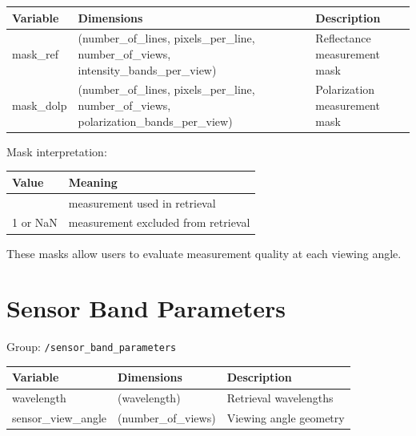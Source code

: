 \documentclass[
  letterpaper,
]{scrbook}
\begin{document}
\begin{longtable}[]{@{}
  >{\raggedright\arraybackslash}p{}
  >{\raggedright\arraybackslash}p{}
  >{\raggedright\arraybackslash}p{}@{}}
\toprule\noalign{}
\begin{minipage}[b]{\linewidth}\raggedright
Variable
\end{minipage} & \begin{minipage}[b]{\linewidth}\raggedright
Dimensions
\end{minipage} & \begin{minipage}[b]{\linewidth}\raggedright
Description
\end{minipage} \\
\midrule\noalign{}
\endhead
\bottomrule\noalign{}
\endlastfoot
mask\_ref & (number\_of\_lines, pixels\_per\_line, number\_of\_views,
intensity\_bands\_per\_view) & Reflectance measurement mask \\
mask\_dolp & (number\_of\_lines, pixels\_per\_line, number\_of\_views,
polarization\_bands\_per\_view) & Polarization measurement mask \\
\end{longtable}

Mask interpretation:

\begin{longtable}[]{@{}ll@{}}
\toprule\noalign{}
Value & Meaning \\
\midrule\noalign{}
\endhead
\bottomrule\noalign{}
\endlastfoot
0 & measurement used in retrieval \\
1 or NaN & measurement excluded from retrieval \\
\end{longtable}

These masks allow users to evaluate measurement quality at each viewing
angle.

\section{Sensor Band Parameters}\label{sensor-band-parameters}

Group: \texttt{/sensor\_band\_parameters}

\begin{longtable}[]{@{}lll@{}}
\toprule\noalign{}
Variable & Dimensions & Description \\
\midrule\noalign{}
\endhead
\bottomrule\noalign{}
\endlastfoot
wavelength & (wavelength) & Retrieval wavelengths \\
sensor\_view\_angle & (number\_of\_views) & Viewing angle geometry \\
\end{longtable}
\end{document}
